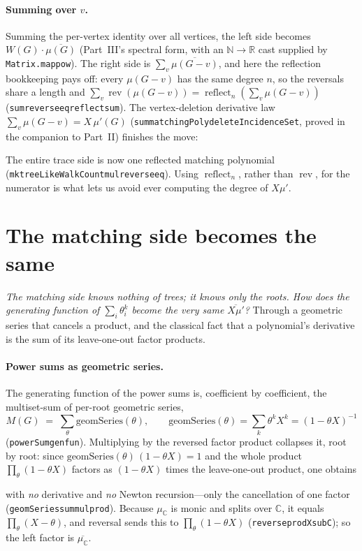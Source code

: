 \documentclass[11pt]{article}
\newcommand{\lean}[1]{{\def\_{\textunderscore\allowbreak}\texttt{#1}}}
\newcommand{\R}{\mathbb{R}}
\newcommand{\C}{\mathbb{C}}
\newcommand{\N}{\mathbb{N}}
\DeclareMathOperator{\reflect}{reflect}
\DeclareMathOperator{\rev}{rev}
\newcommand{\keyeq}[1]{\begin{center}\keybox{$\displaystyle #1$}\end{center}}
\begin{document}
\paragraph{Summing over $v$.} Summing the per-vertex identity over all vertices, the left side becomes
$W(G)\cdot\overline{\mu(G)}$ (Part~III's spectral form, with an $\N\to\R$ cast supplied by
\lean{Matrix.map\_pow}). The right side is $\sum_v\overline{\mu(G-v)}$, and here the reflection
bookkeeping pays off: every $\mu(G-v)$ has the same degree $n$, so the reversals share a length and
$\sum_v\rev(\mu(G-v))=\reflect_n(\sum_v\mu(G-v))$ (\lean{sum\_reverse\_eq\_reflect\_sum}). The
vertex-deletion derivative law $\sum_v\mu(G-v)=X\,\mu'(G)$ (\lean{sum\_matchingPoly\_deleteIncidenceSet},
proved in the companion to Part~II) finishes the move:
\keyeq{W(G)\cdot\overline{\mu(G)}\;=\;\overline{X\,\mu'(G)}.}
{\sloppy The entire trace side is now one reflected matching polynomial
(\lean{mk\_treeLikeWalkCount\_mul\_reverse\_eq}). Using $\reflect_n$, rather than $\rev$, for the
numerator is what lets us avoid ever computing the degree of $X\mu'$.\par}

\section{The matching side becomes the same}
\label{sec:match}

\emph{The matching side knows nothing of trees; it knows only the roots. How does the generating
function of $\sum_i\theta_i^k$ become the very same $\overline{X\mu'}$?} Through a geometric series
that cancels a product, and the classical fact that a polynomial's derivative is the sum of its
leave-one-out factor products.

\paragraph{Power sums as geometric series.} The generating function of the power sums is, coefficient
by coefficient, the multiset-sum of per-root geometric series,
\[
  M(G)\;=\;\sum_{\theta}\mathrm{geomSeries}(\theta),\qquad
  \mathrm{geomSeries}(\theta)=\sum_k\theta^kX^k=(1-\theta X)^{-1}
\]
(\lean{powerSum\_genfun}). Multiplying by the reversed factor product collapses it, root by root: since
$\mathrm{geomSeries}(\theta)\,(1-\theta X)=1$ and the whole product
$\prod_\theta(1-\theta X)$ factors as $(1-\theta X)$ times the leave-one-out product, one obtains
\keyeq{\Bigl(\sum_\theta\mathrm{geomSeries}(\theta)\Bigr)\cdot\!\prod_\theta(1-\theta X)\;=\;\sum_\theta\!\prod_{\varphi\neq\theta}(1-\varphi X)}
with \emph{no} derivative and \emph{no} Newton recursion---only the cancellation of one factor
(\lean{geomSeries\_sum\_mul\_prod}). Because $\mu_\C$ is monic and splits over $\C$, it equals
$\prod_\theta(X-\theta)$, and reversal sends this to $\prod_\theta(1-\theta X)$
(\lean{reverse\_prod\_X\_sub\_C}); so the left factor is $\overline{\mu_\C}$.
\end{document}
